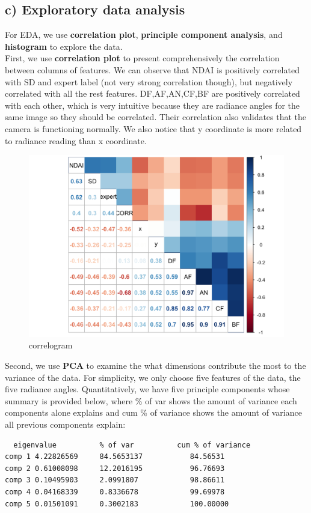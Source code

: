 \documentclass[jou]{apa}%
\begin{document}
\subsection{c) Exploratory data analysis}
For EDA, we use \textbf{correlation plot}, \textbf{principle component analysis}, and \textbf{histogram} to explore the data.\\
\indent First, we use \textbf{correlation plot} to present comprehensively the correlation between columns of features. We can observe that NDAI is positively correlated with SD and expert label (not very strong correlation though), but negatively correlated with all the rest features. DF,AF,AN,CF,BF are positively correlated with each other, which is very intuitive because they are radiance angles for the same image so they should be correlated. Their correlation also validates that the camera is functioning normally. We also notice that y coordinate is more related to radiance reading than x coordinate.
\begin{figure}[H]\hspace*{-1cm} \centering\includegraphics[scale=0.15,]{overallcorrelogram-1}\caption{correlogram}\end{figure}
\indent Second, we use \textbf{PCA} to examine the what dimensions contribute the most to the variance of the data. For simplicity, we only choose five features of the data, the five radiance angles. Quantitatively, we have five principle components whose summary is provided below, where \% of var shows the amount of variance each components alone explains and cum \% of variance shows the amount of variance all previous components explain:
\begin{verbatim}
  eigenvalue          % of var 		    cum % of variance
comp 1 4.22826569     84.5653137           84.56531
comp 2 0.61008098     12.2016195           96.76693
comp 3 0.10495903     2.0991807            98.86611
comp 4 0.04168339     0.8336678            99.69978
comp 5 0.01501091     0.3002183            100.00000
\end{verbatim}
\end{document}
